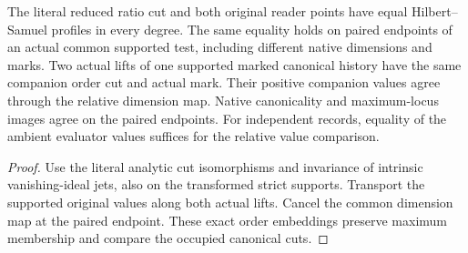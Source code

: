 \begin{theorem}
\label{hir:g1-paired-native-profile-companion-values}
\leanok
The literal reduced ratio cut and both original reader points
have equal Hilbert--Samuel profiles in every degree. The same
equality holds on paired endpoints of an actual common
supported test, including different native dimensions and
marks. Two actual lifts of one supported marked canonical
history have the same companion order cut and actual mark.
Their positive companion values agree through the relative
dimension map. Native canonicality and maximum-locus images
agree on the paired endpoints. For independent records,
equality of the ambient evaluator values suffices for the
relative value comparison.
\end{theorem}
\begin{proof}
Use the literal analytic cut isomorphisms and invariance
of intrinsic vanishing-ideal jets, also on the transformed
strict supports. Transport the supported original values
along both actual lifts. Cancel the common dimension map
at the paired endpoint. These exact order embeddings preserve
maximum membership and compare the occupied canonical cuts.
\end{proof}

